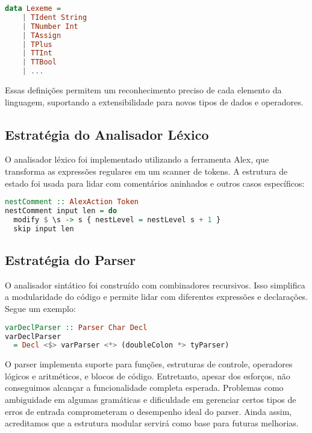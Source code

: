 \documentclass[a4paper,12pt]{article}
\begin{document}
\begin{lstlisting}[language=Haskell, caption={Exemplo de associação de tokens a tipos}]
data Lexeme =
    | TIdent String
    | TNumber Int
    | TAssign
    | TPlus
    | TTInt
    | TTBool
    | ...
\end{lstlisting}

Essas definições permitem um reconhecimento preciso de cada elemento da linguagem, suportando a extensibilidade para novos tipos de dados e operadores.

\subsection{Estratégia do Analisador Léxico}

O analisador léxico foi implementado utilizando a ferramenta Alex, que transforma as expressões regulares em um scanner de tokens. A estrutura de estado foi usada para lidar com comentários aninhados e outros casos específicos:

\begin{lstlisting}[language=Haskell, caption={Gerenciamento de estados para comentários}]
nestComment :: AlexAction Token
nestComment input len = do
  modify $ \s -> s { nestLevel = nestLevel s + 1 }
  skip input len
\end{lstlisting}

\subsection{Estratégia do Parser}

O analisador sintático foi construído com combinadores recursivos. Isso simplifica a modularidade do código e permite lidar com diferentes expressões e declarações. Segue um exemplo:

\begin{lstlisting}[language=Haskell, caption={Parser para declarações de variáveis}]
varDeclParser :: Parser Char Decl
varDeclParser
  = Decl <$> varParser <*> (doubleColon *> tyParser)
\end{lstlisting}

O parser implementa suporte para funções, estruturas de controle, operadores lógicos e aritméticos, e blocos de código. Entretanto, apesar dos esforços, não conseguimos alcançar a funcionalidade completa esperada. Problemas como ambiguidade em algumas gramáticas e dificuldade em gerenciar certos tipos de erros de entrada comprometeram o desempenho ideal do parser. Ainda assim, acreditamos que a estrutura modular servirá como base para futuras melhorias.
\end{document}
